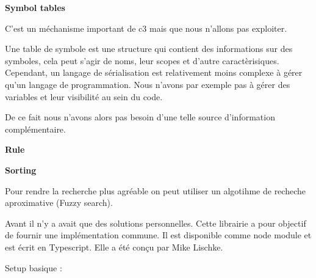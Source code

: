 \documentclass[
    iict, %
    il, %
]{heig-tb}
\begin{document}


\textbf{Symbol tables}

C'est un méchanisme important de c3 mais que nous n'allons pas exploiter.

Une table de symbole est une structure qui contient des informations sur des symboles, cela peut s'agir de noms, leur scopes et d'autre caractèrisiques.
Cependant, un langage de sérialisation est relativement moins complexe à gérer qu'un langage de programmation.
Nous n'avons par exemple pas à gérer des variables et leur visibilité au sein du code.

De ce fait nous n'avons alors pas besoin d'une telle source d'information complémentaire.


\textbf{Rule}



\textbf{Sorting}

Pour rendre la recherche plus agréable on peut utiliser un algotihme de recheche aproximative (Fuzzy search).









Avant il n'y a avait que des solutions personnelles. Cette librairie a pour objectif de fournir une implémentation commune. Il est disponible comme node module et est écrit en Typescript.
Elle a été conçu par Mike Lischke.

Setup basique :
\end{document}
